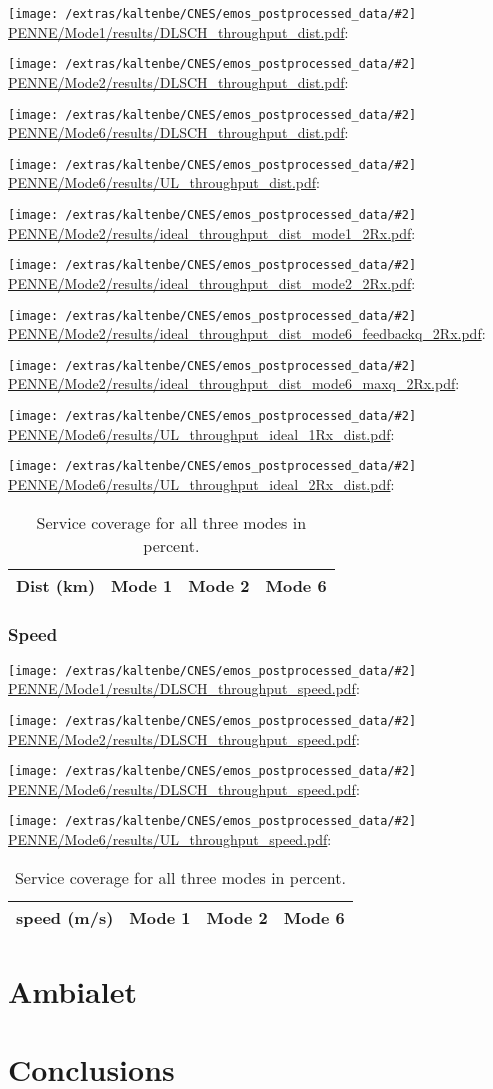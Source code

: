\documentclass[a4paper,10pt]{article}
\newcommand{\printfile}[2][]{
 \begin{minipage}{8cm}
  \centering
  \texttt{[image: /extras/kaltenbe/CNES/emos\_postprocessed\_data/\#2]}
  \url{#2}: #1

 \end{minipage}
}
\begin{document}
\printfile{PENNE/Mode1/results/DLSCH_throughput_dist.pdf}
\printfile{PENNE/Mode2/results/DLSCH_throughput_dist.pdf}

\printfile{PENNE/Mode6/results/DLSCH_throughput_dist.pdf}
\printfile{PENNE/Mode6/results/UL_throughput_dist.pdf}


\printfile{PENNE/Mode2/results/ideal_throughput_dist_mode1_2Rx.pdf}
%
\printfile{PENNE/Mode2/results/ideal_throughput_dist_mode2_2Rx.pdf}

\printfile{PENNE/Mode2/results/ideal_throughput_dist_mode6_feedbackq_2Rx.pdf}
%
\printfile{PENNE/Mode2/results/ideal_throughput_dist_mode6_maxq_2Rx.pdf}

\printfile{PENNE/Mode6/results/UL_throughput_ideal_1Rx_dist.pdf}
\printfile{PENNE/Mode6/results/UL_throughput_ideal_2Rx_dist.pdf}

\begin{table}
\centering
\begin{tabular}{l|l|l|l}
Dist (km) & Mode 1 & Mode 2 & Mode 6\\
\hline
\end{tabular}
\caption{Service coverage for all three modes in percent.}
\end{table}

\subsubsection{Speed}

\printfile{PENNE/Mode1/results/DLSCH_throughput_speed.pdf}
\printfile{PENNE/Mode2/results/DLSCH_throughput_speed.pdf}

\printfile{PENNE/Mode6/results/DLSCH_throughput_speed.pdf}
\printfile{PENNE/Mode6/results/UL_throughput_speed.pdf}

\begin{table}
\centering
\begin{tabular}{l|l|l|l}
speed (m/s) & Mode 1 & Mode 2 & Mode 6\\
\hline
\end{tabular}
\caption{Service coverage for all three modes in percent.}
\end{table}



\section{Ambialet}
\label{sec:ambialet}

\section{Conclusions}


 

\end{document}
